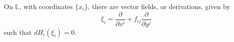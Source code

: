     
    On \( \mathbb{L}\), with coordinates \(\{x_i\}\), there are vector fields, or derivations, given by
    \[ \xi_i=\frac{\partial}{\partial x^i}+ f_{ij}\frac{\partial}{\partial y^j} \] 
    such that \( d H_i ( \xi_i ) = 0\).
    
    
    
    
    
